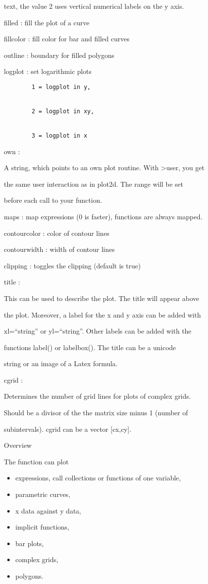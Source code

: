 \documentclass[
]{book}
\providecommand{\tightlist}{%
  \setlength{\itemsep}{0pt}\setlength{\parskip}{0pt}}
\begin{document}
text, the value 2 uses vertical numerical labels on the y axis.

filled : fill the plot of a curve

fillcolor : fill color for bar and filled curves

outline : boundary for filled polygons

logplot : set logarithmic plots

\begin{verbatim}
        1 = logplot in y,


        2 = logplot in xy,


        3 = logplot in x
\end{verbatim}

own :

A string, which points to an own plot routine. With \textgreater user, you get

the same user interaction as in plot2d. The range will be set

before each call to your function.

maps : map expressions (0 is faster), functions are always mapped.

contourcolor : color of contour lines

contourwidth : width of contour lines

clipping : toggles the clipping (default is true)

title :

This can be used to describe the plot. The title will appear above

the plot. Moreover, a label for the x and y axis can be added with

xl=``string'' or yl=``string''. Other labels can be added with the

functions label() or labelbox(). The title can be a unicode

string or an image of a Latex formula.

cgrid :

Determines the number of grid lines for plots of complex grids.

Should be a divisor of the the matrix size minus 1 (number of

subintervals). cgrid can be a vector {[}cx,cy{]}.

Overview

The function can plot

\begin{itemize}
\tightlist
\item
  expressions, call collections or functions of one variable,
\item
  parametric curves,
\item
  x data against y data,
\item
  implicit functions,
\item
  bar plots,
\item
  complex grids,
\item
  polygons.
\end{itemize}
\end{document}
